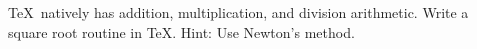 \TeX\ natively has addition, multiplication, and division arithmetic.
Write a square root routine in \TeX. Hint: Use Newton's method.
